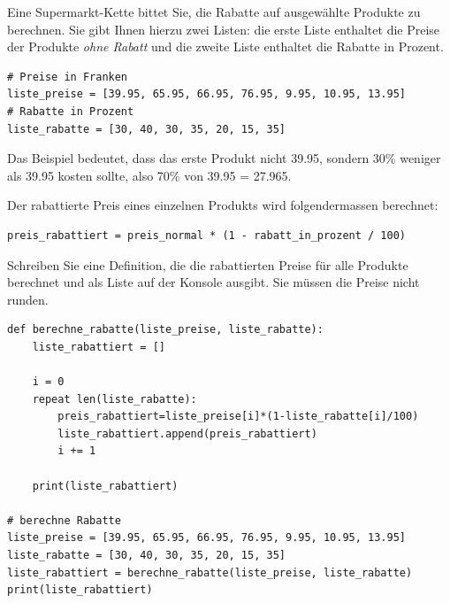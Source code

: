 \begin{myexercise}
    Eine Supermarkt-Kette bittet Sie, die Rabatte auf ausgewählte Produkte zu berechnen. Sie gibt Ihnen hierzu zwei Listen: die erste Liste enthaltet die Preise der Produkte \textit{ohne Rabatt} und die zweite Liste enthaltet die Rabatte in Prozent.

    \begin{lstlisting}
# Preise in Franken
liste_preise = [39.95, 65.95, 66.95, 76.95, 9.95, 10.95, 13.95] 
# Rabatte in Prozent
liste_rabatte = [30, 40, 30, 35, 20, 15, 35] 
\end{lstlisting}

    Das Beispiel bedeutet, dass das erste Produkt nicht 39.95, sondern 30\% weniger als 39.95 kosten sollte, also 70\% von 39.95 = 27.965.

    Der rabattierte Preis eines einzelnen Produkts wird folgendermassen berechnet:
    \begin{lstlisting}
preis_rabattiert = preis_normal * (1 - rabatt_in_prozent / 100)
\end{lstlisting}
    Schreiben Sie eine Definition, die die rabattierten Preise für alle Produkte berechnet und als Liste auf der Konsole ausgibt. Sie müssen die Preise nicht runden.

    \begin{myanswer}
        \begin{lstlisting}
def berechne_rabatte(liste_preise, liste_rabatte):
    liste_rabattiert = []
    
    i = 0
    repeat len(liste_rabatte):
        preis_rabattiert=liste_preise[i]*(1-liste_rabatte[i]/100)
        liste_rabattiert.append(preis_rabattiert)
        i += 1
        
    print(liste_rabattiert)

# berechne Rabatte
liste_preise = [39.95, 65.95, 66.95, 76.95, 9.95, 10.95, 13.95]
liste_rabatte = [30, 40, 30, 35, 20, 15, 35]
liste_rabattiert = berechne_rabatte(liste_preise, liste_rabatte)
print(liste_rabattiert)
\end{lstlisting}
    \end{myanswer}
\end{myexercise}

